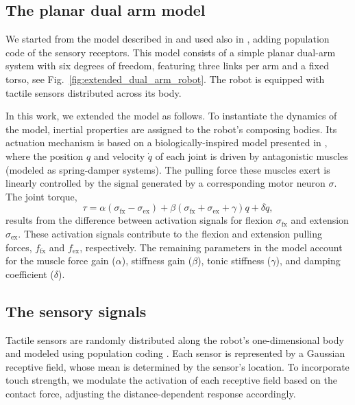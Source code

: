 \subsection{The planar dual arm model}
We started from the model described in \cite{Mannella2018Knowyourbody} and used also in \cite{Marcel2022Learningreachown}, adding population code of the sensory receptors. This model consists of a simple planar dual-arm system with six degrees of freedom, featuring three links per arm and a fixed torso, see Fig.~\ref{fig:extended_dual_arm_robot}. The robot is equipped with tactile sensors distributed across its body. 

In this work, we extended the model as follows. 
To instantiate the dynamics of the model, inertial properties are assigned to the robot's composing bodies. Its actuation mechanism is based on a biologically-inspired model presented in \cite{Shim2012Chaoticexplorationlearning}, where the position $q$ and velocity $\dot{q}$ of each joint is driven by antagonistic muscles (modeled as spring-damper systems). The pulling force these muscles exert is linearly controlled by the signal generated by a corresponding motor neuron $\sigma$. The joint torque,
\begin{equation}\label{eq:antagonistic_torque}
	\tau = \alpha \left(\sigma_\mathrm{fx} - \sigma_\mathrm{ex}\right)  + \beta \left(\sigma_\mathrm{fx} + \sigma_\mathrm{ex} + \gamma \right) q + \delta \dot{q},
\end{equation}
results from the difference between activation signals for flexion $ \sigma_\mathrm{fx} $ and extension $\sigma_\mathrm{ex}$. These activation signals contribute to the flexion and extension pulling forces, $ f_\mathrm{fx}$ and $f_\mathrm{ex} $, respectively. The remaining parameters in the model account for the muscle force gain ($\alpha$), stiffness gain ($\beta$), tonic stiffness ($\gamma$), and damping coefficient ($\delta$).

\subsection{The sensory signals}
Tactile sensors are randomly distributed along the robot's one-dimensional body and modeled using population coding \cite{Panzeri2010PopulationCoding}. Each sensor is represented by a Gaussian receptive field, whose mean is determined by the sensor's location. %
To incorporate touch strength, we modulate the activation of each receptive field based on the contact force, adjusting the distance-dependent response accordingly.  

